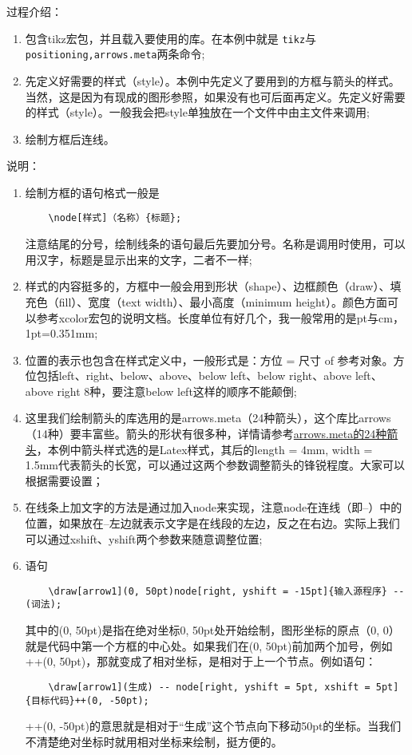 过程介绍：
\begin{enumerate}
	\item 包含tikz宏包，并且载入要使用的库。在本例中就是
	\lstinline{tikz}与
	\lstinline{positioning,arrows.meta}两条命令;
	\item 先定义好需要的样式（style）。本例中先定义了要用到的方框与箭头的样式。当然，这是因为有现成的图形参照，如果没有也可后面再定义。先定义好需要的样式（style）。一般我会把style单独放在一个文件中由主文件来调用;
	\item 绘制方框后连线。
\end{enumerate}
说明：
\begin{enumerate}
	\item 绘制方框的语句格式一般是
	\begin{lstlisting}
	\node[样式]（名称）{标题};
	\end{lstlisting}
	注意结尾的分号，绘制线条的语句最后先要加分号。名称是调用时使用，可以用汉字，标题是显示出来的文字，二者不一样;
	\item 样式的内容挺多的，方框中一般会用到形状（shape）、边框颜色（draw）、填充色（fill）、宽度（text width）、最小高度（minimum height）。颜色方面可以参考xcolor宏包的说明文档。长度单位有好几个，我一般常用的是pt与cm，1pt=0.351mm;
	\item 位置的表示也包含在样式定义中，一般形式是：方位 = 尺寸 of 参考对象。方位包括left、right、below、above、below left、below right、above left、above right 8种，要注意below left这样的顺序不能颠倒;
	\item 这里我们绘制箭头的库选用的是arrows.meta（24种箭头），这个库比arrows（14种）要丰富些。箭头的形状有很多种，详情请参考\href{https://stuff.mit.edu/afs/athena/contrib/tex-contrib/beamer/pgf-1.01/doc/generic/pgf/version-for-tex4ht/en/pgfmanualse24.html}{arrows.meta的24种箭头}，本例中箭头样式选的是Latex样式，其后的length = 4mm, width = 1.5mm代表箭头的长宽，可以通过这两个参数调整箭头的锋锐程度。大家可以根据需要设置；
	\item 在线条上加文字的方法是通过加入node来实现，注意node在连线（即–）中的位置，如果放在–左边就表示文字是在线段的左边，反之在右边。实际上我们可以通过xshift、yshift两个参数来随意调整位置;
	\item 语句
	\begin{lstlisting}
	\draw[arrow1](0, 50pt)node[right, yshift = -15pt]{输入源程序} -- (词法);
	\end{lstlisting}
	其中的(0, 50pt)是指在绝对坐标0, 50pt处开始绘制，图形坐标的原点（0, 0）就是代码中第一个方框的中心处。如果我们在(0, 50pt)前加两个加号，例如++(0, 50pt)，那就变成了相对坐标，是相对于上一个节点。例如语句：
	\begin{lstlisting}
	\draw[arrow1](生成) -- node[right, yshift = 5pt, xshift = 5pt]{目标代码}++(0, -50pt);
	\end{lstlisting}
	++(0, -50pt)的意思就是相对于“生成”这个节点向下移动50pt的坐标。当我们不清楚绝对坐标时就用相对坐标来绘制，挺方便的。
\end{enumerate}
